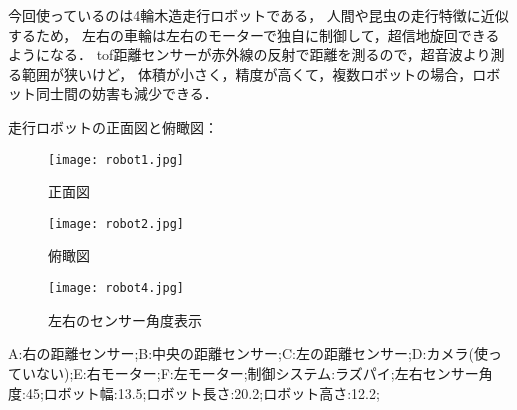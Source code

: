
今回使っているのは4輪木造走行ロボットである，
人間や昆虫の走行特徴に近似するため，
左右の車輪は左右のモーターで独自に制御して，超信地旋回できるようになる．
tof距離センサーが赤外線の反射で距離を測るので，超音波より測る範囲が狭いけど，
体積が小さく，精度が高くて，複数ロボットの場合，ロボット同士間の妨害も減少できる．

走行ロボットの正面図と俯瞰図：
\begin{figure}[h]
    \begin{minipage}{0.48\linewidth}
        \centering
        \texttt{[image: robot1.jpg]}
        \caption{正面図}
    \end{minipage}
    \begin{minipage}{0.48\linewidth}
        \centering
        \texttt{[image: robot2.jpg]}
        \caption{俯瞰図}
    \end{minipage}
\end{figure}
\vspace{-6mm}
\begin{figure}[h]
        \centering
        \texttt{[image: robot4.jpg]}
        \caption{左右のセンサー角度表示}
\end{figure}


A:右の距離センサー;B:中央の距離センサー;C:左の距離センサー;D:カメラ(使っていない);E:右モーター;F:左モーター;制御システム:ラズパイ;左右センサー角度:45\degree;ロボット幅:13.5;ロボット長さ:20.2;ロボット高さ:12.2;


